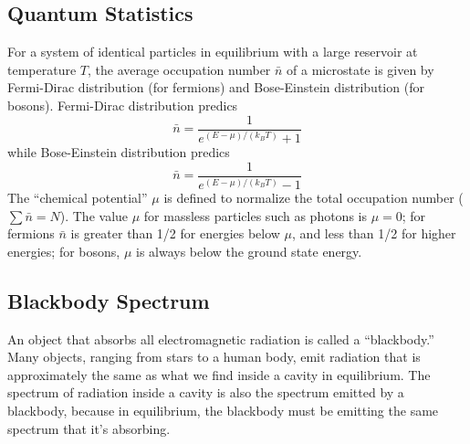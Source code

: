 \documentclass[../../main.tex]{subfiles}
\begin{document}
\subsection{Quantum Statistics}
For a system of identical particles in equilibrium with a large reservoir at temperature $T$, the average occupation number $\bar{n}$ of a microstate is given by Fermi-Dirac distribution (for fermions) and Bose-Einstein distribution (for bosons). Fermi-Dirac distribution predics
\begin{equation*}
    \bar{n}=\frac{1}{e^{(E-\mu)/(k_BT)}+1}
\end{equation*}
while Bose-Einstein distribution predics
\begin{equation*}
    \bar{n}=\frac{1}{e^{(E-\mu)/(k_BT)}-1}
\end{equation*}
The “chemical potential” $\mu$ is defined to normalize the total occupation number ($\sum \bar{n} = N$). The value $\mu$ for massless particles such as photons is $\mu=0 $; for fermions $\bar{n}$ is greater than 1/2 for energies below $\mu$, and less than 1/2 for higher energies; for bosons, $\mu$ is always below the ground state energy.

\subsection{Blackbody Spectrum}
An object that absorbs all electromagnetic radiation is called a “blackbody.” Many objects, ranging from stars to a human body, emit radiation that is approximately the same as what we find inside a cavity in equilibrium. The spectrum of radiation inside a cavity is also the spectrum emitted by a blackbody, because in equilibrium, the blackbody must be emitting the same spectrum that it's absorbing. 
\end{document}
